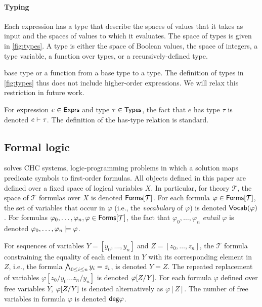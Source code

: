 \paragraph{Typing}
%
Each expression has a type that describe the spaces of values that it
takes as input and the spaces of values to which it evaluates.
%
The space of types is given in \autoref{fig:types}.
%
A type is either the space of Boolean values, the space of integers, %
a type variable, %
a function over types, or %
a recursively-defined type.

base type or a function from a base type to a type.
%
The definition of types in \autoref{fig:types} thus does not include
higher-order expressions.
%
We will relax this restriction in future work.
%

For expression $e \in \expr$ and type $\tau \in \types$, the fact that
$e$ has type $\tau$ is denoted $e \hastype \tau$.
%
The definition of the has-type relation is standard.

\subsection{Formal logic}
\label{sec:itps}
%
\sys solves CHC systems, logic-programming problems in which a
solution maps predicate symbols to first-order formulas.
%
All objects defined in this paper are defined over a fixed space of
logical variables $X$.
%
In particular, for theory $\mathcal{T}$, the space of $\mathcal{T}$
formulas over $X$ is denoted $\tformulas{\mathcal{T}}$.
%
For each formula $\varphi \in \tformulas{\mathcal{T}}$, the set of
variables that occur in $\varphi$ (i.e., the \emph{vocabulary} of
$\varphi$) is denoted $\vocab(\varphi)$.
For formulas $\varphi_0, \ldots, \varphi_n, \varphi \in
\tformulas{\mathcal{T}}$, the fact that $\varphi_0, \ldots, \varphi_n$
\emph{entail} $\varphi$ is denoted $\varphi_0, \ldots, \varphi_n
\entails \varphi$.

For sequences of variables $Y = [ y_0, \ldots, y_n ]$ and $Z = [ z_0,
\ldots, z_n ]$, the $\mathcal{T}$ formula constraining the equality of
each element in $Y$ with its corresponding element in $Z$, i.e., the
formula $\bigland_{0 \leq i \leq n} y_i = z_i$, is denoted $Y = Z$.
%
The repeated replacement of variables $\varphi[ z_0 / y_0 \ldots z_{n}
/ y_{n} ]$ is denoted $\replace{\varphi}{Y}{Z}$.
%
For each formula $\varphi$ defined over free variables $Y$,
$\replace{\varphi}{Y}{Z}$ is denoted alternatively as $\varphi[ Z ]$.
%
The number of free variables in formula $\varphi$ is denoted
$\degreeof{\varphi}$.

